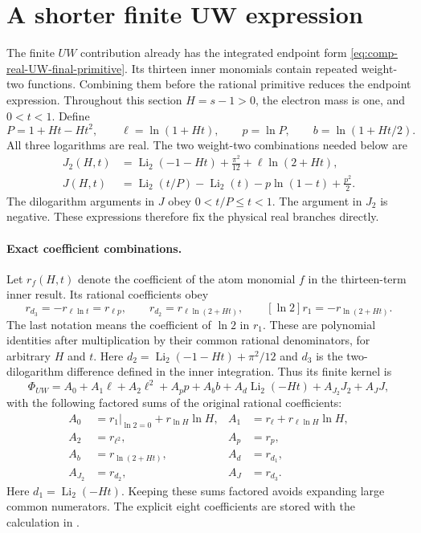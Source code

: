 \section{A shorter finite UW expression}
\label{sec:comp-UW-simplified}
The finite $UW$ contribution already has the integrated endpoint form
\eqref{eq:comp-real-UW-final-primitive}. Its thirteen inner monomials
contain repeated weight-two functions. Combining them before the
rational primitive reduces the endpoint expression. Throughout this
section $H=s-1>0$, the electron mass is one, and $0<t<1$.
Define
\begin{equation}
 P=1+Ht-Ht^2,\qquad \ell=\ln(1+Ht),\qquad
 p=\ln P,\qquad b=\ln(1+Ht/2).
\end{equation}
All three logarithms are real. The two weight-two combinations needed
below are
\begin{align}
 J_2(H,t)&=\operatorname{Li}_2(-1-Ht)+\frac{\pi^2}{12}
       +\ell\ln(2+Ht),\\
 J(H,t)&=\operatorname{Li}_2(t/P)-\operatorname{Li}_2(t)
       -p\ln(1-t)+\frac{p^2}{2}.
 \label{eq:comp-UW-J-short}
\end{align}
The dilogarithm arguments in $J$ obey $0<t/P\leq t<1$.
The argument in $J_2$ is negative. These expressions therefore fix the
physical real branches directly.

\paragraph{Exact coefficient combinations.} Let $r_f(H,t)$ denote the
coefficient of the atom monomial $f$ in the thirteen-term inner result.
Its rational coefficients obey
\begin{equation}
 r_{d_3}=-r_{\ell\ln t}=r_{\ell p},\qquad
 r_{d_2}=r_{\ell\ln(2+Ht)},\qquad
 [\ln2]r_1=-r_{\ln(2+Ht)}.
 \label{eq:comp-UW-coefficient-combinations}
\end{equation}
The last notation means the coefficient of $\ln2$ in $r_1$.
These are polynomial identities after multiplication by their common
rational denominators, for arbitrary $H$ and $t$. Here
$d_2=\operatorname{Li}_2(-1-Ht)+\pi^2/12$ and $d_3$ is the two-dilogarithm
difference defined in the inner integration. Thus its finite kernel is
\begin{equation}
 \Phi_{UW}=A_0+A_1\ell+A_2\ell^2+A_p p+A_b b
             +A_d\operatorname{Li}_2(-Ht)+A_{J_2}J_2+A_JJ,
 \label{eq:comp-UW-eight-kernel}
\end{equation}
with the following factored sums of the original rational coefficients:
\begin{align}
 A_0&=\left.r_1\right|_{\ln2=0}+r_{\ln H}\ln H,
 &A_1&=r_\ell+r_{\ell\ln H}\ln H,\\
 A_2&=r_{\ell^2},& A_p&=r_p,\\
 A_b&=r_{\ln(2+Ht)},& A_d&=r_{d_1},\\
 A_{J_2}&=r_{d_2},& A_J&=r_{d_3}.
\end{align}
Here $d_1=\operatorname{Li}_2(-Ht)$. Keeping these sums factored avoids
expanding large common numerators. The explicit eight coefficients are
stored with the calculation in
\texttt{}.

